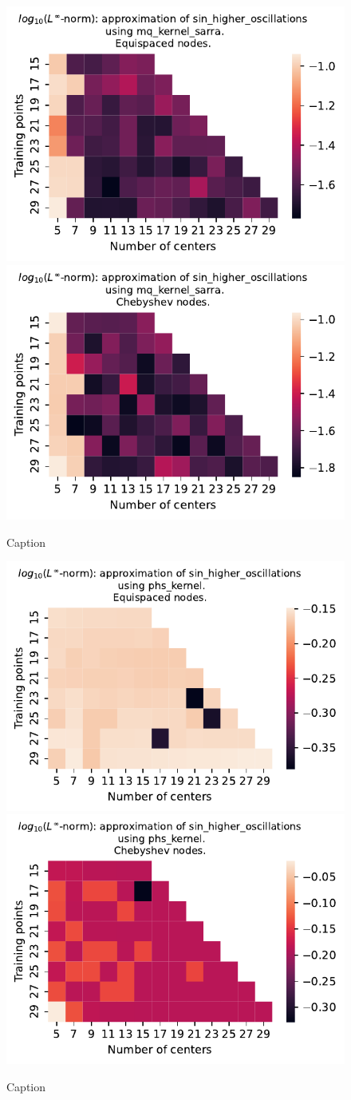 \documentclass[12pt]{report} %
\begin{document}
\begin{figure}[ht]
    \centering
    
    \includegraphics[width=.49\textwidth]{imagenes/experiments/1d/variational/sin_higher_oscillations-Kmq_kernel_sarra-Equi.pdf}
    \includegraphics[width=.49\textwidth]{imagenes/experiments/1d/variational/sin_higher_oscillations-Kmq_kernel_sarra-Cheb.pdf}
    \caption{Caption}
    \label{fig:sin-higher-oscillations-sarra}
\end{figure}

\begin{figure}[ht]
    \centering
    
    \includegraphics[width=.49\textwidth]{imagenes/experiments/1d/variational/sin_higher_oscillations-Kphs_kernel-Equi.pdf}
    \includegraphics[width=.49\textwidth]{imagenes/experiments/1d/variational/sin_higher_oscillations-Kphs_kernel-Cheb.pdf}
    \caption{Caption}
    \label{fig:sin-higher-oscillations-phs}
\end{figure}
\end{document}
